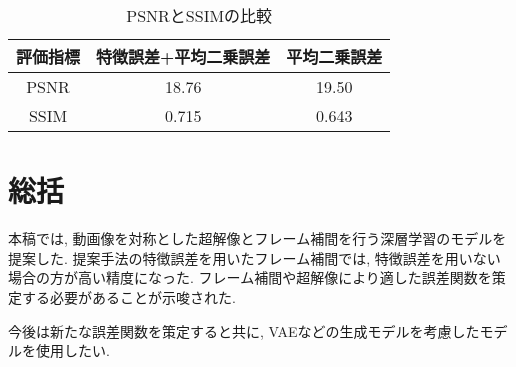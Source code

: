 \documentclass[twocolumn,a4j,uplatex]{jsarticle}
\begin{document}
\begin{table}[htbp]
    \caption{PSNRとSSIMの比較}
    \label{table:comp}
    \begin{tabular}{|c|c|c|}\hline
        評価指標 & 特徴誤差+平均二乗誤差 & 平均二乗誤差 \\ \hline
        PSNR & 18.76 & 19.50 \\ \hline
        SSIM & 0.715 & 0.643 \\ \hline
    \end{tabular}
\end{table}

\section{総括}
本稿では, 動画像を対称とした超解像とフレーム補間を行う深層学習のモデルを提案した.
提案手法の特徴誤差を用いたフレーム補間では, 特徴誤差を用いない場合の方が高い精度になった.
フレーム補間や超解像により適した誤差関数を策定する必要があることが示唆された.

今後は新たな誤差関数を策定すると共に, VAEなどの生成モデルを考慮したモデルを使用したい.


\end{document}
